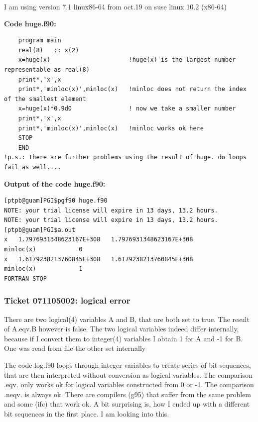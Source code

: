 \documentclass[a4paper,10pt]{report}
\begin{document}
I am using version 7.1 linux86-64 from oct.19 on suse linux 10.2 (x86-64)

\textbf{Code huge.f90:}
\begin{verbatim}
    program main
    real(8)   :: x(2)
    x=huge(x)                      !huge(x) is the largest number representable as real(8)
    print*,'x',x     
    print*,'minloc(x)',minloc(x)   !minloc does not return the index of the smallest element
    x=huge(x)*0.9d0                ! now we take a smaller number
    print*,'x',x
    print*,'minloc(x)',minloc(x)   !minloc works ok here
    STOP
    END
!p.s.: There are further problems using the result of huge. do loops fail as well....
\end{verbatim}

\textbf{Output of the code huge.f90:}
\begin{verbatim}
[ptpb@guam]PGI$pgf90 huge.f90
NOTE: your trial license will expire in 13 days, 13.2 hours.
NOTE: your trial license will expire in 13 days, 13.2 hours.
[ptpb@guam]PGI$a.out
x   1.7976931348623167E+308   1.7976931348623167E+308
minloc(x)            0
x   1.6179238213760845E+308   1.6179238213760845E+308
minloc(x)            1
FORTRAN STOP
\end{verbatim}


\subsubsection{Ticket 071105002: logical error}
There are two logical(4) variables A and B, that are both
set to true. The result of A.eqv.B however is false. The two logical
variables indeed differ internally, because if I convert them to
integer(4) variables I obtain 1 for A and -1 for B. One was read from
file the other set internally

The code log.f90 loops through integer variables to create series of
bit sequences, that are then interpreted without conversion as logical
variables. The comparison .eqv. only works ok for logical variables
constructed from 0 or -1. The comparison .neqv. is always ok. There
are compilers (g95) that suffer from the same problem and some (ifc)
that work ok. A bit surprising is, how I ended up with a different bit
sequences in the first place. I am looking into this.
\end{document}
